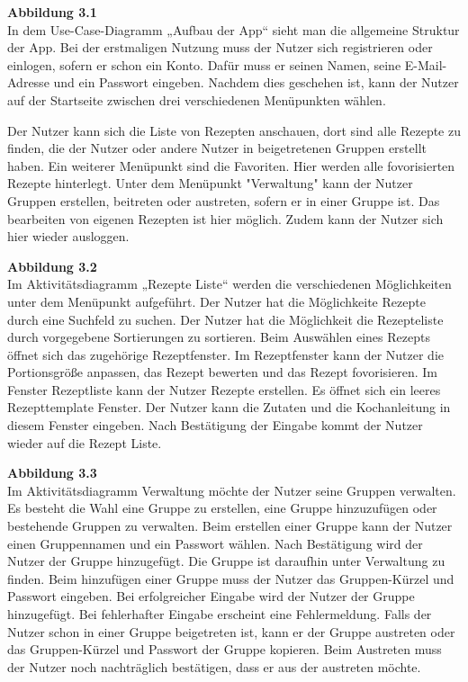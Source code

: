 \documentclass[parskip=full]{scrartcl}
\begin{document}
\textbf{Abbildung 3.1}\\
In dem Use-Case-Diagramm „Aufbau der App“ sieht man die allgemeine Struktur der App.
Bei der erstmaligen Nutzung muss der Nutzer sich registrieren oder einlogen, sofern er schon ein Konto.
Dafür muss er seinen Namen, seine E-Mail-Adresse und ein Passwort eingeben.
Nachdem dies geschehen ist, kann der Nutzer auf der Startseite zwischen drei verschiedenen Menüpunkten wählen.

Der Nutzer kann sich die Liste von Rezepten anschauen, dort sind alle Rezepte zu finden, die der Nutzer oder andere Nutzer in beigetretenen Gruppen erstellt haben.
Ein weiterer Menüpunkt sind die Favoriten.
Hier werden alle fovorisierten Rezepte hinterlegt.
Unter dem Menüpunkt "Verwaltung" kann der Nutzer Gruppen erstellen, beitreten oder austreten, sofern er in einer Gruppe ist.
Das bearbeiten von eigenen Rezepten ist hier möglich.
Zudem kann der Nutzer sich hier wieder ausloggen.

\textbf{Abbildung 3.2}\\
Im Aktivitätsdiagramm „Rezepte Liste“ werden die verschiedenen Möglichkeiten unter dem Menüpunkt aufgeführt.
Der Nutzer hat die Möglichkeite Rezepte durch eine Suchfeld zu suchen.
Der Nutzer hat die Möglichkeit die Rezepteliste durch vorgegebene Sortierungen zu sortieren.
Beim Auswählen eines Rezepts öffnet sich das zugehörige Rezeptfenster.
Im Rezeptfenster kann der Nutzer die Portionsgröße anpassen, das Rezept bewerten und das Rezept fovorisieren.
Im Fenster Rezeptliste kann der Nutzer Rezepte erstellen.
Es öffnet sich ein leeres Rezepttemplate Fenster.
Der Nutzer kann die Zutaten und die Kochanleitung in diesem Fenster eingeben.
Nach Bestätigung der Eingabe kommt der Nutzer wieder auf die Rezept Liste.

\textbf{Abbildung 3.3}\\
Im Aktivitätsdiagramm Verwaltung  möchte der Nutzer seine Gruppen verwalten.
Es besteht die Wahl eine Gruppe zu erstellen, eine Gruppe hinzuzufügen oder bestehende Gruppen zu verwalten.
Beim erstellen einer Gruppe kann der Nutzer einen Gruppennamen und ein Passwort wählen.
Nach Bestätigung wird der Nutzer der Gruppe hinzugefügt.
Die Gruppe ist daraufhin unter Verwaltung zu finden.
Beim hinzufügen einer Gruppe muss der Nutzer das Gruppen-Kürzel und Passwort eingeben.
Bei erfolgreicher Eingabe wird der Nutzer der Gruppe hinzugefügt.
Bei fehlerhafter Eingabe erscheint eine Fehlermeldung.
Falls der Nutzer schon in einer Gruppe beigetreten ist, kann er der Gruppe austreten oder das Gruppen-Kürzel und Passwort der Gruppe kopieren.
Beim Austreten muss der Nutzer noch nachträglich bestätigen, dass er aus der austreten möchte.
\newpage
\end{document}
